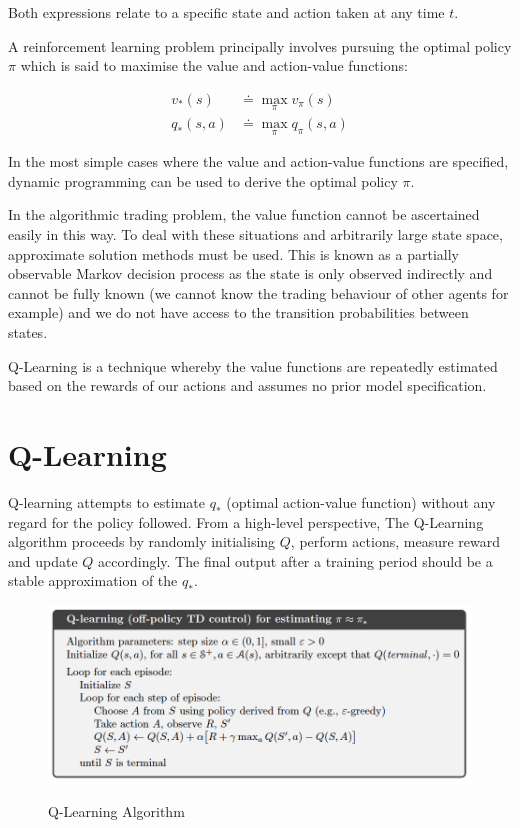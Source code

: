 \documentclass[12pt, authoryear]{elsarticle}
\begin{document}
Both expressions relate to a specific state and action taken at any time $t$.

A reinforcement learning problem principally involves pursuing the optimal policy $\pi$ which is said to maximise the value and action-value functions:

$$
\begin{aligned}
v _ { * } ( s ) &\doteq \max _ { \pi } v _ { \pi } ( s )\\
q _ { * } ( s , a ) &\doteq \max _ { \pi } q _ { \pi } ( s , a )
\end{aligned}
$$

In the most simple cases where the value and action-value functions are specified, dynamic programming can be used to derive the optimal policy $\pi$.

In the algorithmic trading problem, the value function cannot be ascertained easily in this way. To deal with these situations and arbitrarily large state space, approximate solution methods must be used. This is known as a partially observable Markov decision process as the state is only observed indirectly and cannot be fully known (we cannot know the trading behaviour of other agents for example) and we do not have access to the transition probabilities between states.

Q-Learning is a technique whereby the value functions are repeatedly estimated based on the rewards of our actions and assumes no prior model specification.

\section{Q-Learning} 

Q-learning attempts to estimate $q_{*}$ (optimal action-value function) without any regard for the policy followed. From a high-level perspective, The Q-Learning algorithm proceeds by randomly initialising $Q$, perform actions, measure reward and update $Q$ accordingly. The final output after a training period should be a stable approximation of the $q_{*}$.

\begin{figure}[h!]
	\centering
	\caption{Q-Learning Algorithm}
	\includegraphics[clip, angle=0, width=13cm]{figures/psudo_code.png}
	\label{fig:1}
\end{figure}
\end{document}
